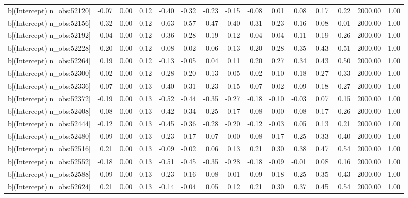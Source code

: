 \begin{table}[ht]
\begin{tabular}{rrrrrrrrrrrrrrr}
  b[(Intercept) n\_obs:52120] & -0.07 & 0.00 & 0.12 & -0.40 & -0.32 & -0.23 & -0.15 & -0.08 & 0.01 & 0.08 & 0.17 & 0.22 & 2000.00 & 1.00 \\ 
  b[(Intercept) n\_obs:52156] & -0.32 & 0.00 & 0.12 & -0.63 & -0.57 & -0.47 & -0.40 & -0.31 & -0.23 & -0.16 & -0.08 & -0.01 & 2000.00 & 1.00 \\ 
  b[(Intercept) n\_obs:52192] & -0.04 & 0.00 & 0.12 & -0.36 & -0.28 & -0.19 & -0.12 & -0.04 & 0.04 & 0.11 & 0.19 & 0.26 & 2000.00 & 1.00 \\ 
  b[(Intercept) n\_obs:52228] & 0.20 & 0.00 & 0.12 & -0.08 & -0.02 & 0.06 & 0.13 & 0.20 & 0.28 & 0.35 & 0.43 & 0.51 & 2000.00 & 1.00 \\ 
  b[(Intercept) n\_obs:52264] & 0.19 & 0.00 & 0.12 & -0.13 & -0.05 & 0.04 & 0.11 & 0.20 & 0.27 & 0.34 & 0.43 & 0.50 & 2000.00 & 1.00 \\ 
  b[(Intercept) n\_obs:52300] & 0.02 & 0.00 & 0.12 & -0.28 & -0.20 & -0.13 & -0.05 & 0.02 & 0.10 & 0.18 & 0.27 & 0.33 & 2000.00 & 1.00 \\ 
  b[(Intercept) n\_obs:52336] & -0.07 & 0.00 & 0.13 & -0.40 & -0.31 & -0.23 & -0.15 & -0.07 & 0.02 & 0.09 & 0.18 & 0.27 & 2000.00 & 1.00 \\ 
  b[(Intercept) n\_obs:52372] & -0.19 & 0.00 & 0.13 & -0.52 & -0.44 & -0.35 & -0.27 & -0.18 & -0.10 & -0.03 & 0.07 & 0.15 & 2000.00 & 1.00 \\ 
  b[(Intercept) n\_obs:52408] & -0.08 & 0.00 & 0.13 & -0.42 & -0.34 & -0.25 & -0.17 & -0.08 & 0.00 & 0.08 & 0.17 & 0.26 & 2000.00 & 1.00 \\ 
  b[(Intercept) n\_obs:52444] & -0.12 & 0.00 & 0.13 & -0.45 & -0.36 & -0.28 & -0.20 & -0.12 & -0.03 & 0.05 & 0.13 & 0.21 & 2000.00 & 1.00 \\ 
  b[(Intercept) n\_obs:52480] & 0.09 & 0.00 & 0.13 & -0.23 & -0.17 & -0.07 & -0.00 & 0.08 & 0.17 & 0.25 & 0.33 & 0.40 & 2000.00 & 1.00 \\ 
  b[(Intercept) n\_obs:52516] & 0.21 & 0.00 & 0.13 & -0.09 & -0.02 & 0.06 & 0.13 & 0.21 & 0.30 & 0.38 & 0.47 & 0.54 & 2000.00 & 1.00 \\ 
  b[(Intercept) n\_obs:52552] & -0.18 & 0.00 & 0.13 & -0.51 & -0.45 & -0.35 & -0.28 & -0.18 & -0.09 & -0.01 & 0.08 & 0.16 & 2000.00 & 1.00 \\ 
  b[(Intercept) n\_obs:52588] & 0.09 & 0.00 & 0.13 & -0.23 & -0.16 & -0.08 & 0.01 & 0.09 & 0.18 & 0.25 & 0.35 & 0.43 & 2000.00 & 1.00 \\ 
  b[(Intercept) n\_obs:52624] & 0.21 & 0.00 & 0.13 & -0.14 & -0.04 & 0.05 & 0.12 & 0.21 & 0.30 & 0.37 & 0.45 & 0.54 & 2000.00 & 1.00 \\ 

\end{tabular}
\end{table}
